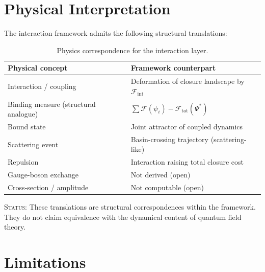 \documentclass[12pt]{article}
\newcommand{\Fcal}{\mathcal{F}}
\newcommand{\Fint}{\Fcal_{\mathrm{int}}}
\newcommand{\Ftot}{\Fcal_{\mathrm{tot}}}
\begin{document}
\section{Physical Interpretation}\label{sec:interpretation}

The interaction framework admits the following structural translations:

\begin{table}[ht]
\centering
\caption{Physics correspondence for the interaction layer.}
\label{tab:physics}
\begin{tabular}{@{}ll@{}}
\toprule
Physical concept & Framework counterpart \\
\midrule
Interaction / coupling & Deformation of closure landscape by $\Fint$ \\
Binding measure (structural analogue) & $\sum\Fcal(\psi_i) - \Ftot(\Psi^*)$ \\
Bound state & Joint attractor of coupled dynamics \\
Scattering event & Basin-crossing trajectory (scattering-like) \\
Repulsion & Interaction raising total closure cost \\
Gauge-boson exchange & Not derived (open) \\
Cross-section / amplitude & Not computable (open) \\
\bottomrule
\end{tabular}
\end{table}

\textsc{Status:} These translations are structural correspondences within the framework. They do not claim equivalence with the dynamical content of quantum field theory.

\section{Limitations}\label{sec:limits}
\end{document}
